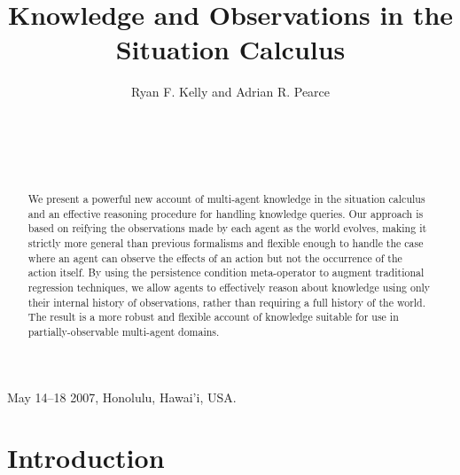 \documentclass{ifaamas-submission}
\begin{document}
 {May 14--18 2007, Honolulu, Hawai'i, USA.}

\title{Knowledge and Observations in the Situation Calculus
}


\author{
\alignauthor
Ryan F. Kelly and Adrian R. Pearce\\
\\
\\
\\
\\
}

\maketitle

\begin{abstract}
We present a powerful new account of multi-agent knowledge in the
situation calculus and an effective reasoning procedure for handling
knowledge queries. Our approach is based on reifying the observations
made by each agent as the world evolves, making it strictly more general
than previous formalisms and flexible enough to handle the case where
an agent can observe the effects of an action but not the occurrence
of the action itself. By using the persistence condition meta-operator
to augment traditional regression techniques, we allow agents to effectively
reason about knowledge using only their internal history of observations,
rather than requiring a full history of the world. The result is a
more robust and flexible account of knowledge suitable for use in
partially-observable multi-agent domains. 
\end{abstract}




\section{Introduction}
\end{document}
